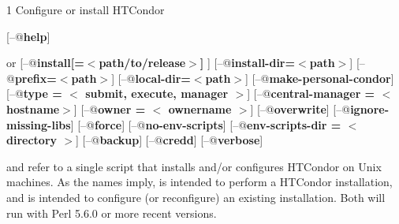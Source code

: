 \begin{ManPage}{\label{man-condor-configure}}{1}
{Configure or install HTCondor}


\Synopsis {}
[\verb@--@\textbf{help}]

 or 
[\verb@--@\textbf{install[=$<$path/to/release$>$] }]
[\verb@--@\textbf{install-dir=$<$path$>$}]
[\verb@--@\textbf{prefix=$<$path$>$}]
[\verb@--@\textbf{local-dir=$<$path$>$}]
[\verb@--@\textbf{make-personal-condor}]
[\verb@--@\textbf{type = $<$ submit, execute, manager $>$}]
[\verb@--@\textbf{central-manager = $<$ hostname$>$}]
[\verb@--@\textbf{owner = $<$ ownername $>$}]
[\verb@--@\textbf{overwrite}]
[\verb@--@\textbf{ignore-missing-libs}]
[\verb@--@\textbf{force}]
[\verb@--@\textbf{no-env-scripts}]
[\verb@--@\textbf{env-scripts-dir = $<$ directory $>$}]
[\verb@--@\textbf{backup}]
[\verb@--@\textbf{credd}]
[\verb@--@\textbf{verbose}]





\Description 

 and  refer to a single script that installs
and/or configures HTCondor on Unix machines.  As the names imply,
 is intended to perform a HTCondor installation, and
 is intended to configure (or reconfigure) an
existing installation.
Both will run with Perl 5.6.0 or more recent versions.


\end{ManPage}

